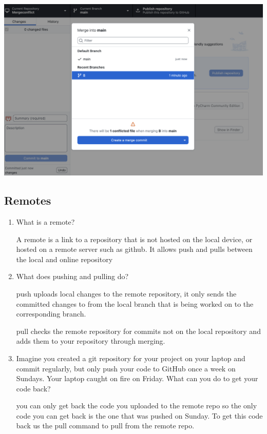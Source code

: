 \documentclass[10pt,twocolumn]{article}
\begin{document}
\begin{enumerate}
\includegraphics[width=\linewidth]{18.png}

\medskip

\end{enumerate}

\subsection{Remotes}

\begin{enumerate}
\item What is a remote?

\medskip
A remote is a link to a repository that is not hosted on the local device, or hosted on a remote server such as github. It allows push and pulls between the local and online repository
\medskip

\item What does pushing and pulling do?

\medskip
push uploads local changes to the remote repository, it only sends the committed changes to from the local branch that is being worked on to the corresponding branch.

pull checks the remote repository for commits not on the local repository and adds them to your repository through merging.
\medskip

\item Imagine you created a git repository for your project on your laptop and commit regularly, but only push your code to GitHub once a week on Sundays. Your laptop caught on fire on Friday. What can you do to get your code back?

\medskip
you can only get back the code you uploaded to the remote repo so the only code you can get back is the one that was pushed on Sunday. To get this code back us the pull command to pull from the remote repo.
\medskip

\end{enumerate}
\end{document}
